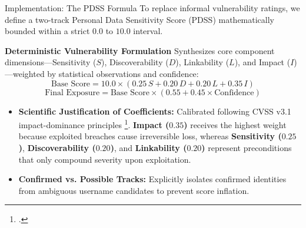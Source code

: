 \documentclass[aspectratio=169,10pt]{beamer}
\begin{document}
\begin{frame}{Implementation: The PDSS Formula}
  \small
  To replace informal vulnerability ratings, we define a two-track Personal Data Sensitivity Score (PDSS) mathematically bounded within a strict $0.0$ to $10.0$ interval.
  
  \vspace{0.15cm}
  \begin{block}{\centering \textbf{Deterministic Vulnerability Formulation}}
    \scriptsize
    Synthesizes core component dimensions—Sensitivity ($S$), Discoverability ($D$), Linkability ($L$), and Impact ($I$)—weighted by statistical observations and confidence:
    $$\text{Base Score} = 10.0 \times \left(0.25\,S + 0.20\,D + 0.20\,L + 0.35\,I\right)$$
    $$\text{Final Exposure} = \text{Base Score} \times \left(0.55 + 0.45 \times \text{Confidence}\right)$$
  \end{block}

  \vspace{0.15cm}
  \begin{itemize}\setlength{\itemsep}{0.15cm}
    \item \textbf{Scientific Justification of Coefficients:} Calibrated following CVSS v3.1 impact-dominance principles \footcite{cvss2019}. \textbf{Impact ($\mathbf{0.35}$)} receives the highest weight because exploited breaches cause irreversible loss, whereas \textbf{Sensitivity ($\mathbf{0.25}$)}, \textbf{Discoverability ($\mathbf{0.20}$)}, and \textbf{Linkability ($\mathbf{0.20}$)} represent preconditions that only compound severity upon exploitation.
    \item \textbf{Confirmed vs. Possible Tracks:} Explicitly isolates confirmed identities from ambiguous username candidates to prevent score inflation.
  \end{itemize}
\end{frame}
\end{document}
